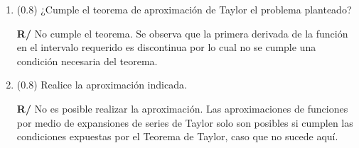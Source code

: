 \documentclass[12pt]{article}
\begin{document}
\begin{enumerate}[leftmargin=*,widest=9]
   \begin{enumerate}[label=\alph*]
    \item (\(0.8\)) ¿Cumple el teorema de aproximación de Taylor el problema planteado?


    \textbf{R/} No cumple el teorema. Se observa que la primera derivada de la función en el intervalo requerido es discontinua por lo cual no se cumple una condición necesaria del teorema.

\item (\(0.8\)) Realice la aproximación indicada.


\textbf{R/} No es posible realizar la aproximación. Las aproximaciones de funciones por medio de expansiones de series de Taylor solo son posibles si cumplen las condiciones expuestas por el Teorema de Taylor, caso que no sucede aquí.

  \end{enumerate}
\end{enumerate}
\end{document}
